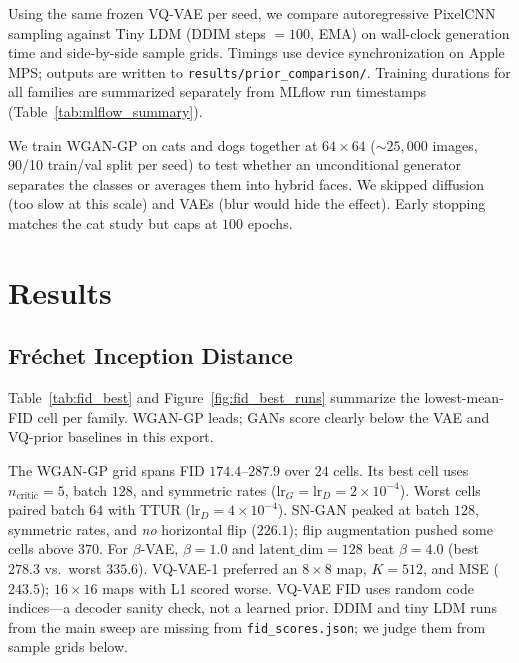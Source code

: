 \documentclass[cameraready]{Interspeech}
\begin{document}
\begin{description}[leftmargin=1.25em, labelsep=0.5em, itemsep=0.6em, topsep=0.4em]
\item[PixelCNN vs.\ Tiny LDM Prior Comparison]
Using the same frozen VQ-VAE per seed, we compare autoregressive PixelCNN sampling against Tiny LDM (DDIM steps $=100$, EMA) on wall-clock generation time and side-by-side sample grids. Timings use device synchronization on Apple MPS; outputs are written to \texttt{results/prior\_comparison/}. Training durations for all families are summarized separately from MLflow run timestamps (Table~\ref{tab:mlflow_summary}).

\item[Exploratory Extension: Mixed Distributions (Chimera)]
We train WGAN-GP on cats and dogs together at $64 \times 64$ ($\sim 25{,}000$ images, 90/10 train/val split per seed) to test whether an unconditional generator separates the classes or averages them into hybrid faces. We skipped diffusion (too slow at this scale) and VAEs (blur would hide the effect). Early stopping matches the cat study but caps at $100$ epochs.
\end{description}

\section{Results}
\label{sec:results}

\subsection{Fr\'echet Inception Distance}

Table~\ref{tab:fid_best} and Figure~\ref{fig:fid_best_runs} summarize the lowest-mean-FID cell per family. WGAN-GP leads; GANs score clearly below the VAE and VQ-prior baselines in this export.

The WGAN-GP grid spans FID $174.4$--$287.9$ over $24$ cells. Its best cell uses $n_{\text{critic}}{=}5$, batch $128$, and symmetric rates ($\text{lr}_G{=}\text{lr}_D{=}2{\times}10^{-4}$). Worst cells paired batch $64$ with TTUR ($\text{lr}_D{=}4{\times}10^{-4}$). SN-GAN peaked at batch $128$, symmetric rates, and \emph{no} horizontal flip ($226.1$); flip augmentation pushed some cells above $370$. For $\beta$-VAE, $\beta{=}1.0$ and $\text{latent\_dim}{=}128$ beat $\beta{=}4.0$ (best $278.3$ vs.\ worst $335.6$). VQ-VAE-1 preferred an $8{\times}8$ map, $K{=}512$, and MSE ($243.5$); $16{\times}16$ maps with L1 scored worse. VQ-VAE FID uses random code indices---a decoder sanity check, not a learned prior. DDIM and tiny LDM runs from the main sweep are missing from \texttt{fid\_scores.json}; we judge them from sample grids below.
\end{document}
